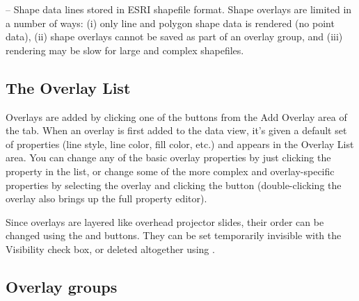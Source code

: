 \begin{description}
\begin{itemize}
\end{itemize}

\item[\button{shapes}{Shape}] -- Shape data lines stored in ESRI
shapefile format. Shape overlays are limited in a number of ways:
(i) only line and polygon shape data is rendered (no point data),
(ii) shape overlays cannot be saved as part of an overlay group,
and (iii) rendering may be slow for large and complex shapefiles.

\end{description}

\subsection{The {\gui Overlay List}}
\label{overlay_list}

Overlays are added by clicking one of the buttons from the
{\gui Add Overlay} area of the 
tab.  When an overlay is first added to the data view, it's given
a default set of properties (line style, line color, fill color,
etc.) and appears in the {\gui Overlay List} area.  You can change
any of the basic overlay properties by just clicking the property
in the list, or change some of the more complex and
overlay-specific properties by selecting the overlay and clicking
the  button
(double-clicking the overlay also brings up the full property
editor).

Since overlays are layered like overhead projector slides, their
order can be changed using the 
and  buttons.  They can be
set temporarily invisible with the {\gui Visibility} check box, or
deleted altogether using .

\subsection{Overlay groups}


